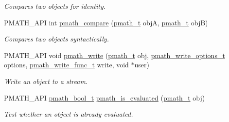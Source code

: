 \begin{CompactItemize}
\begin{CompactList}\small\item\em Compares two objects for identity. \item\end{CompactList}\item 
PMATH\_\-API int \hyperlink{group__objects_gc57589e08f5b3eed28e724c646503735}{pmath\_\-compare} (\hyperlink{classpmath__t}{pmath\_\-t} objA, \hyperlink{classpmath__t}{pmath\_\-t} objB)
\begin{CompactList}\small\item\em Compares two objects syntactically. \item\end{CompactList}\item 
PMATH\_\-API void \hyperlink{group__objects_g9f909b9eb04317260ee8630d10e5a7c6}{pmath\_\-write} (\hyperlink{classpmath__t}{pmath\_\-t} obj, \hyperlink{group__objects_gd83ea6a616c49cbe35b5d3dafb877f7e}{pmath\_\-write\_\-options\_\-t} options, \hyperlink{group__general__types_g781a2e0445795bb4e091470fb20497cc}{pmath\_\-write\_\-func\_\-t} write, void $\ast$user)
\begin{CompactList}\small\item\em Write an object to a stream. \item\end{CompactList}\item 
PMATH\_\-API \hyperlink{group__general__types_gc92090cb0b56345d6c379ed2341d4ef4}{pmath\_\-bool\_\-t} \hyperlink{group__objects_gb26224de5170fa688fa67dd2e85834e3}{pmath\_\-is\_\-evaluated} (\hyperlink{classpmath__t}{pmath\_\-t} obj)
\begin{CompactList}\small\item\em Test whether an object is already evaluated. \item\end{CompactList}\end{CompactItemize}
